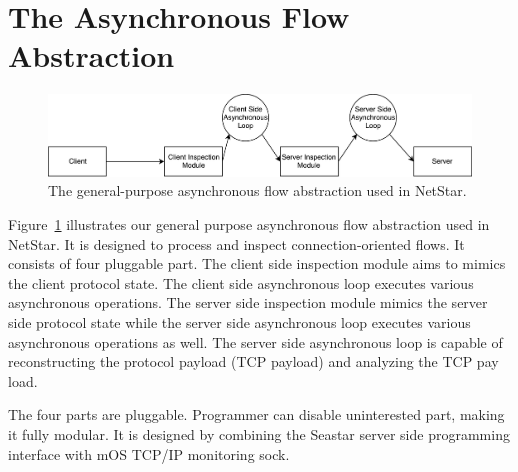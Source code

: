\section{The Asynchronous Flow Abstraction}

\begin{figure}[!t]
  \centering
  \includegraphics[width=\columnwidth]{figure/async-flow.pdf}
  \vspace{-2mm}
  \caption{The general-purpose asynchronous flow abstraction used in NetStar.}
  \label{fig:async-flow}
  \vspace{-6mm}
\end{figure}

Figure~\ref{fig:async-flow} illustrates our general purpose asynchronous flow abstraction used in NetStar. It is designed to process and inspect connection-oriented flows. It consists of four pluggable part. The client side inspection module aims to mimics the client protocol state. The client side asynchronous loop executes various asynchronous operations. The server side inspection module mimics the server side protocol state while the server side asynchronous loop executes various asynchronous operations as well. The server side asynchronous loop is capable of reconstructing the protocol payload (TCP payload) and analyzing the TCP pay load.

The four parts are pluggable. Programmer can disable uninterested part, making it fully modular. It is designed by combining the Seastar server side programming interface with mOS TCP/IP monitoring sock.

